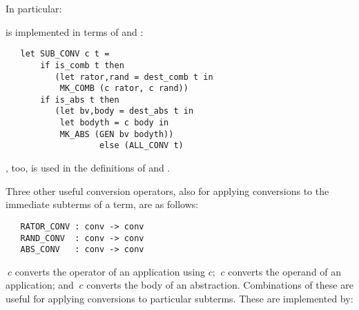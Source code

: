 \noindent In particular:


\noindent {} is implemented in terms of
 and :

\begin{hol}\begin{verbatim}
   let SUB_CONV c t =
       if is_comb t then
          (let rator,rand = dest_comb t in
           MK_COMB (c rator, c rand))
       if is_abs t then
          (let bv,body = dest_abs t in
           let bodyth = c body in
           MK_ABS (GEN bv bodyth))
                   else (ALL_CONV t)
\end{verbatim}\end{hol}

\noindent {}, too, is used in the definitions of
 and .

Three other useful conversion operators, also for applying conversions
to the immediate subterms of a term, are as follows:


\begin{boxed}
\begin{verbatim}
   RATOR_CONV : conv -> conv
   RAND_CONV  : conv -> conv
   ABS_CONV   : conv -> conv
\end{verbatim}\end{boxed}

\noindent {}$\ c$ converts the operator of an application using
$c$; $\ c$ converts the operand of an application; and
$\ c$ converts the body of an abstraction. Combinations
of these are useful for applying conversions to particular subterms.
These are implemented by:

